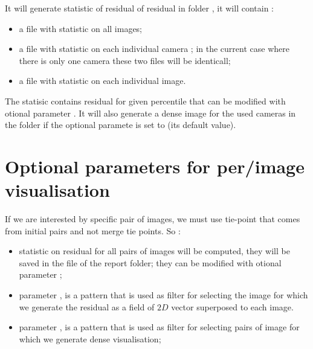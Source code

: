 \documentclass[a4paper]{article}
\begin{document}
It will generate statistic of residual of residual in folder , 
it will contain :

\begin{itemize}
   \item  a file   with statistic on all images;
   \item  a file   with statistic on each individual camera ; in the current case 
         where there is only one camera these two files will be identicall; 
   \item  a file   with statistic on each individual image.
\end{itemize}


The statisic contains residual for given percentile that can be modified with otional parameter  .
It will also generate a dense image for the used cameras in the folder  
if the optional paramete   is set to   (its default value).


\section{Optional parameters  for  per/image visualisation}

If we are interested by specific pair of images, we must use tie-point that comes
from initial pairs and not merge tie points. So : 

\begin{itemize}

   \item  statistic  on residual for all pairs of images will be computed, they
          will be saved in the file    of the  report folder;
          they can be modified with otional parameter  ;

   \item  parameter   , is a pattern that is used as filter for
          selecting the image for which we generate the residual as a field
          of $2D$ vector superposed to each image.

   \item  parameter   , is a pattern that is used as filter for
          selecting pairs of image for which we generate dense visualisation;
\end{itemize}
\end{document}
